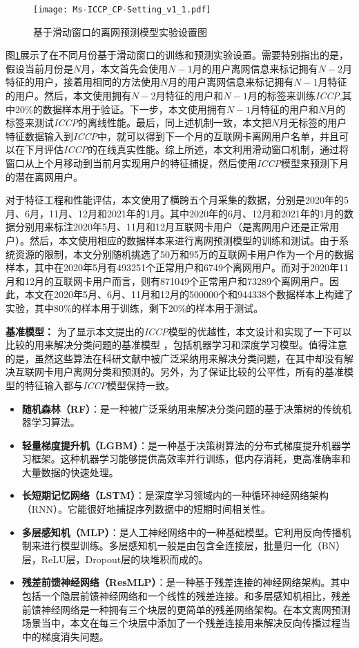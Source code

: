 \begin{figure}[hbt]
	\centering
	\texttt{[image: Ms-ICCP\_CP-Setting\_v1\_1.pdf]}
	\caption{基于滑动窗口的离网预测模型实验设置图}
	\label{Fig:CP-Setting}
\end{figure}

图\ref{Fig:CP-Setting}展示了在不同月份基于滑动窗口的训练和预测实验设置。需要特别指出的是，假设当前月份是$N$月，本文首先会使用$N-1$月的用户离网信息来标记拥有$N-2$月特征的用户，接着用相同的方法使用$N$月的用户离网信息来标记拥有$N-1$月特征的用户。然后，本文使用拥有$N-2$月特征的用户和$N-1$月的标签来训练\emph{ICCP},其中20\%的数据样本用于验证。下一步，本文使用拥有$N-1$月特征的用户和$N$月的标签来测试\emph{ICCP}的离线性能。最后，同上述机制一致，本文把$N$月无标签的用户特征数据输入到\emph{ICCP}中，就可以得到下一个月的互联网卡离网用户名单，并且可以在下月评估\emph{ICCP}的在线真实性能。综上所述，本文利用滑动窗口机制，通过将窗口从上个月移动到当前月实现用户的特征捕捉，然后使用\emph{ICCP}模型来预测下月的潜在离网用户。\par
对于特征工程和性能评估，本文使用了横跨五个月采集的数据，分别是2020年的5月、6月，11月、12月和2021年的1月。其中2020年的6月、12月和2021年的1月的数据分别用来标注2020年5月、11月和12月互联网卡用户（是离网用户还是正常用户）。然后，本文使用相应的数据样本来进行离网预测模型的训练和测试。由于系统资源的限制，本文分别随机挑选了50万和95万的互联网卡用户作为一个月的数据样本，其中在2020年5月有493251个正常用户和6749个离网用户。而对于2020年11月和12月的互联网卡用户而言，则有871049个正常用户和73289个离网用户。因此，本文在2020年5月、6月、11月和12月的500000个和944338个数据样本上构建了实验，其中80\%的样本用于训练，剩下20\%的样本用于测试。\par
\textbf{基准模型：}
为了显示本文提出的\emph{ICCP}模型的优越性，本文设计和实现了一下可以比较的用来解决分类问题的基准模型 ，包括机器学习和深度学习模型。值得注意的是，虽然这些算法在科研文献中被广泛采纳用来解决分类问题，在其中却没有解决互联网卡用户离网分类和预测的。另外，为了保证比较的公平性，所有的基准模型的特征输入都与\emph{ICCP}模型保持一致。
\begin{itemize}
	\item \textbf{随机森林（RF）}：是一种被广泛采纳用来解决分类问题的基于决策树的传统机器学习算法。
	\item \textbf{轻量梯度提升机（LGBM）}：是一种基于决策树算法的分布式梯度提升机器学习框架。这种机器学习能够提供高效率并行训练，低内存消耗，更高准确率和大量数据的快速处理。
	\item \textbf{长短期记忆网络（LSTM）}：是深度学习领域内的一种循环神经网络架构（RNN）。它能很好地捕捉序列数据中的短期时间相关性。
	\item \textbf{多层感知机（MLP）}：是人工神经网络中的一种基础模型。它利用反向传播机制来进行模型训练。多层感知机一般是由包含全连接层，批量归一化（BN）层，ReLU层，Dropout层的块堆积而成的。
	\item \textbf{残差前馈神经网络（ResMLP）}：是一种基于残差连接的神经网络架构。其中包括一个隐层前馈神经网络和一个线性的残差连接。和多层感知机相比，残差前馈神经网络是一种拥有三个块层的更简单的残差网络架构。在本文离网预测场景当中，本文在每三个块层中添加了一个残差连接用来解决反向传播过程当中的梯度消失问题。
\end{itemize}


